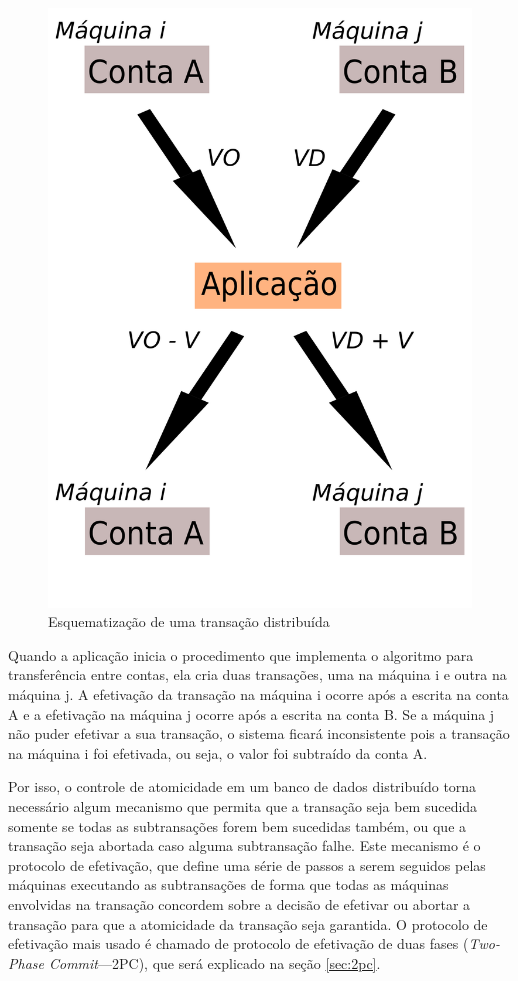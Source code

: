 \documentclass[11pt,twoside,a4paper]{book}
\begin{document}

\begin{figure}
  \centering
  \includegraphics[width=.40\textwidth]{transacao_distribuida} 
  \caption{Esquematização de uma transação distribuída}
  \label{fig:transacao_distribuida} 
\end{figure}


Quando a aplicação inicia o procedimento que implementa o algoritmo para transferência entre contas, ela cria duas transações, uma na máquina i e outra na máquina j. A efetivação da transação na máquina i ocorre após a escrita na conta A e a efetivação na máquina j ocorre após a escrita na conta B. Se a máquina j não puder efetivar a sua transação, o sistema ficará inconsistente pois a transação na máquina i foi efetivada, ou seja, o valor foi subtraído da conta A.

Por isso, o controle de atomicidade em um banco de dados distribuído torna necessário algum mecanismo que permita que a transação seja bem sucedida somente se todas as subtransações forem bem sucedidas também, ou que a transação seja abortada caso alguma subtransação falhe. Este mecanismo é o protocolo de efetivação, que define uma série de passos a serem seguidos pelas máquinas executando as subtransações de forma que todas as máquinas envolvidas na transação concordem sobre a decisão de efetivar ou abortar a transação para que a atomicidade da transação seja garantida. O protocolo de efetivação mais usado é chamado de protocolo de efetivação de duas fases (\emph{Two-Phase Commit}---2PC), que será explicado na seção \ref{sec:2pc}.
\end{document}
